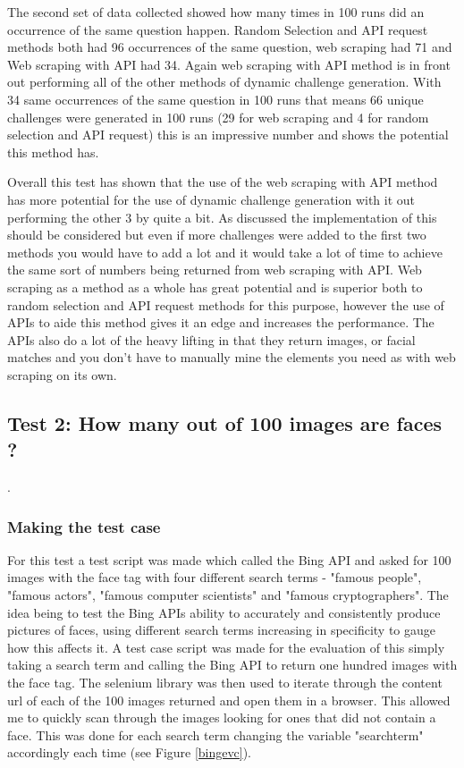 \documentclass[12pt,a4paper]{article}
\begin{document}
The second set of data collected showed how many times in 100 runs did an occurrence of the same question happen. Random Selection and API request methods both had 96 occurrences of the same question, web scraping had 71 and Web scraping with API had 34. Again web scraping with API method is in front out performing all of the other methods of dynamic challenge generation. With 34 same occurrences of the same question in 100 runs that means 66 unique challenges were generated in 100 runs (29 for web scraping and 4 for random selection and API request) this is an impressive number and shows the potential this method has. 

Overall this test has shown that the use of the web scraping with API method has more potential for the use of dynamic challenge generation with it out performing the other 3 by quite a bit. As discussed the implementation of this should be considered but even if more challenges were added to the first two methods you would have to add a lot and it would take a lot of time to achieve the same sort of numbers being returned from web scraping with API. Web scraping as a method as a whole has great potential and is superior both to random selection and API request methods for this purpose, however the use of APIs to aide this method gives it an edge and increases the performance. The APIs also do a lot of the heavy lifting in that they return images, or facial matches and you don't have to manually mine the elements you need as with web scraping on its own.

\subsection{Test 2: How many out of 100 images are faces ?}.   
\subsubsection{Making the test case}
For this test a test script was made which called the Bing API and asked for 100 images with the face tag with four different search terms - "famous people", "famous actors", "famous computer scientists" and "famous cryptographers". The idea being to test the Bing APIs ability to accurately and consistently produce pictures of faces, using different search terms increasing in specificity to gauge how this affects it. A test case script was made for the evaluation of this simply taking a search term and calling the Bing API to return one hundred images with the face tag. The selenium library was then used to iterate through the content url of each of the 100 images returned and open them in a browser. This allowed me to quickly scan through the images looking for ones that did not contain a face. This was done for each search term changing the variable "search\textunderscore term" accordingly each time (see Figure \ref{bingevc}).  
\end{document}
